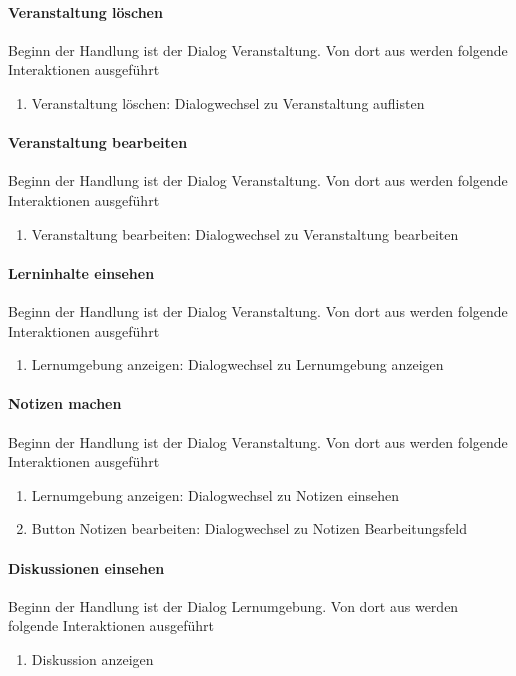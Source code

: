 \documentclass[12pt,a4paper]{article}
\begin{document}
{\paragraph{Veranstaltung löschen}
Beginn der Handlung ist der Dialog \glqq Veranstaltung\grqq. Von dort aus werden folgende Interaktionen ausgeführt
\begin{enumerate}
\item \glqq Veranstaltung löschen\grqq: Dialogwechsel zu \glqq Veranstaltung auflisten \grqq
\end{enumerate}

\paragraph{Veranstaltung bearbeiten}
Beginn der Handlung ist der Dialog \glqq Veranstaltung\grqq. Von dort aus werden folgende Interaktionen ausgeführt
\begin{enumerate}
\item \glqq Veranstaltung bearbeiten\grqq: Dialogwechsel zu \glqq Veranstaltung bearbeiten \grqq
\end{enumerate}

\paragraph{Lerninhalte einsehen}
Beginn der Handlung ist der Dialog \glqq Veranstaltung\grqq. Von dort aus werden folgende Interaktionen ausgeführt
\begin{enumerate}
\item \glqq Lernumgebung anzeigen\grqq: Dialogwechsel zu \glqq Lernumgebung anzeigen\grqq
\end{enumerate}

\paragraph{Notizen machen}
Beginn der Handlung ist der Dialog \glqq Veranstaltung\grqq. Von dort aus werden folgende Interaktionen ausgeführt
\begin{enumerate}
\item \glqq Lernumgebung anzeigen\grqq: Dialogwechsel zu \glqq Notizen einsehen\grqq
\item \glqq Button Notizen bearbeiten\grqq: Dialogwechsel zu \glqq Notizen Bearbeitungsfeld\grqq
\end{enumerate}

\paragraph{Diskussionen einsehen}
Beginn der Handlung ist der Dialog \glqq Lernumgebung\grqq. Von dort aus werden folgende Interaktionen ausgeführt
\begin{enumerate}
\item \glqq Diskussion anzeigen\grqq
\end{enumerate}

}
\end{document}
